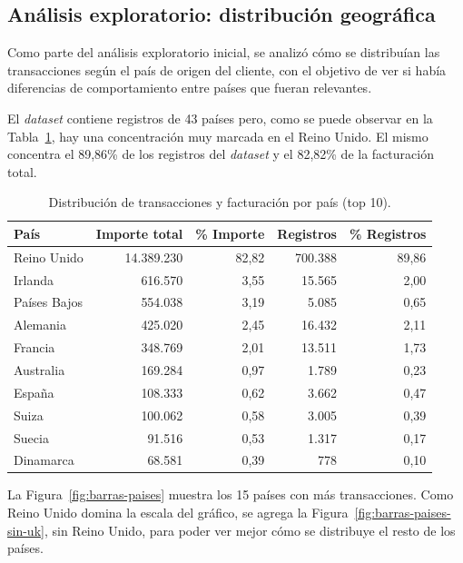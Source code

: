 \documentclass[a4paper,10pts,openany]{book}
\begin{document}
	
	\subsection{Análisis exploratorio: distribución geográfica}
	
	Como parte del análisis exploratorio inicial, se analizó cómo se distribuían las transacciones según el país de origen del cliente, con el objetivo de ver si había diferencias de comportamiento entre países que fueran relevantes.
	
	
	El \emph{dataset} contiene registros de 43 países pero, como se puede observar en la Tabla~\ref{tab:distribucion-paises}, hay una concentración muy marcada en el Reino Unido. El mismo concentra el 89{,}86\% de los registros del \emph{dataset} y el 82{,}82\% de la facturación total.
	\begin{table}[h]
		\centering
		\caption{Distribución de transacciones y facturación por país (top 10).}
		\label{tab:distribucion-paises}
		\begin{tabular}{lrrrr}
			\toprule
			País & Importe total & \% Importe & Registros & \% Registros \\
			\midrule
			Reino Unido      & 14.389.230 & 82{,}82 & 700.388 & 89{,}86 \\
			Irlanda                &    616.570   &  3{,}55 &  15.565 &  2{,}00 \\
			Países Bajos         &    554.038   &  3{,}19 &   5.085 &  0{,}65 \\
			Alemania             &    425.020   &  2{,}45 &  16.432 &  2{,}11 \\
			Francia              &    348.769   &  2{,}01 &  13.511 &  1{,}73 \\
			Australia           &    169.284   &  0{,}97 &   1.789 &  0{,}23 \\
			España               &    108.333   &  0{,}62 &   3.662 &  0{,}47 \\
			Suiza         &    100.062   &  0{,}58 &   3.005 &  0{,}39 \\
			Suecia              &     91.516   &  0{,}53 &   1.317 &  0{,}17 \\
			Dinamarca              &    68.581   &  0{,}39 &     778   &  0{,}10 \\
			\bottomrule
		\end{tabular}
	\end{table}
	
	
	
	La Figura~\ref{fig:barras-paises} muestra los 15 países con más transacciones. Como Reino Unido domina la escala del gráfico, se agrega la Figura~\ref{fig:barras-paises-sin-uk}, sin Reino Unido, para poder ver mejor cómo se distribuye el resto de los países.
	
\end{document}
